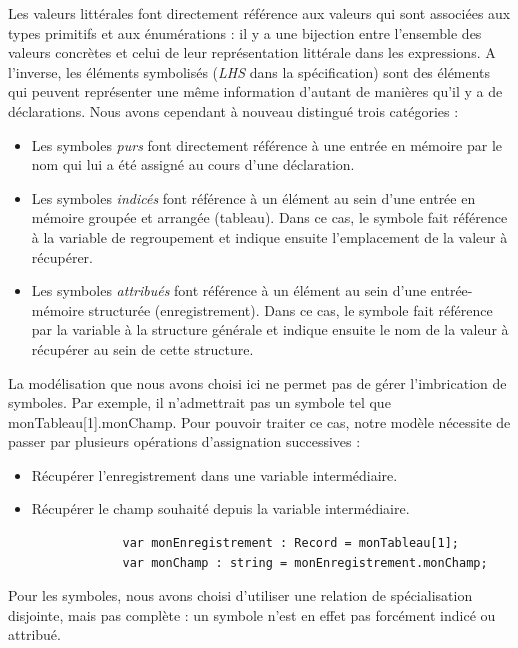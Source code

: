 \documentclass[oneside,a4paper]{book}
\begin{document}
Les valeurs littérales font directement référence aux valeurs qui sont associées aux types primitifs et aux énumérations : il y a une bijection entre l'ensemble des valeurs concrètes et celui de leur représentation littérale dans les expressions. A l'inverse, les éléments symbolisés (\textit{LHS} dans la spécification) sont des éléments qui peuvent représenter une même information d'autant de manières qu'il y a de déclarations. Nous avons cependant à nouveau distingué trois catégories :
\begin{itemize}
    \item Les symboles \textit{purs} font directement référence à une entrée en mémoire par le nom qui lui a été assigné au cours d'une déclaration. 
    \item Les symboles \textit{indicés} font référence à un élément au sein d'une entrée en mémoire groupée et arrangée (tableau). Dans ce cas, le symbole fait référence à la variable de regroupement et indique ensuite l'emplacement de la valeur à récupérer.
    \item Les symboles \textit{attribués} font référence à un élément au sein d'une entrée-mémoire structurée (enregistrement). Dans ce cas, le symbole fait référence par la variable à la structure générale et indique ensuite le nom de la valeur à récupérer au sein de cette structure.
\end{itemize}

\begin{tcolorbox}
    La modélisation que nous avons choisi ici ne permet pas de gérer l'imbrication de symboles. Par exemple, il n'admettrait pas un symbole tel que monTableau[1].monChamp. Pour pouvoir traiter ce cas, notre modèle nécessite de passer par plusieurs opérations d'assignation successives : 
    \begin{itemize}
        \item Récupérer l'enregistrement dans une variable intermédiaire.
        \item Récupérer le champ souhaité depuis la variable intermédiaire.
    \end{itemize}
        \begin{lstlisting}
                var monEnregistrement : Record = monTableau[1];
                var monChamp : string = monEnregistrement.monChamp;
        \end{lstlisting}
\end{tcolorbox}

Pour les symboles, nous avons choisi d'utiliser une relation de spécialisation disjointe, mais pas complète : un symbole n'est en effet pas forcément indicé ou attribué.
\end{document}
